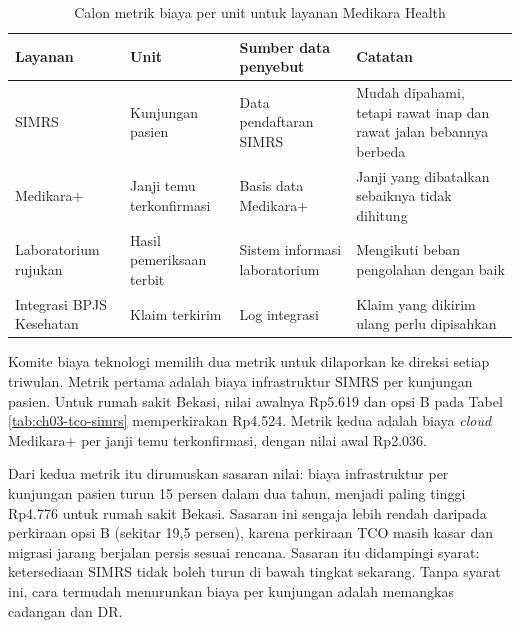 \begin{table}[!htb]
  \centering
  \caption{Calon metrik biaya per unit untuk layanan Medikara Health}
  \label{tab:ch03-unit-metrik}
  \footnotesize
  \begin{tabularx}{\textwidth}{>{\raggedright\arraybackslash}p{2.3cm} >{\raggedright\arraybackslash}p{2.6cm} >{\raggedright\arraybackslash}X >{\raggedright\arraybackslash}X}
    \hline
    \textbf{Layanan} & \textbf{Unit} & \textbf{Sumber data penyebut} & \textbf{Catatan} \\ \hline
    SIMRS & Kunjungan pasien & Data pendaftaran SIMRS & Mudah dipahami, tetapi rawat inap dan rawat
      jalan bebannya berbeda \\ \hline
    Medikara+ & Janji temu terkonfirmasi & Basis data Medikara+ & Janji yang dibatalkan sebaiknya
      tidak dihitung \\ \hline
    Laboratorium rujukan & Hasil pemeriksaan terbit & Sistem informasi laboratorium & Mengikuti
      beban pengolahan dengan baik \\ \hline
    Integrasi BPJS Kesehatan & Klaim terkirim & Log integrasi & Klaim yang dikirim ulang perlu
      dipisahkan \\ \hline
  \end{tabularx}
\end{table}

\begin{kasus}[title={Kasus Medikara Health: Biaya per Kunjungan dan per Janji Temu}]
  Komite biaya teknologi memilih dua metrik untuk dilaporkan ke direksi setiap triwulan. Metrik
  pertama adalah biaya infrastruktur SIMRS per kunjungan pasien. Untuk rumah sakit Bekasi, nilai
  awalnya Rp5.619 dan opsi B pada Tabel \ref{tab:ch03-tco-simrs} memperkirakan Rp4.524. Metrik kedua
  adalah biaya \textit{cloud} Medikara+ per janji temu terkonfirmasi, dengan nilai awal Rp2.036.

  Dari kedua metrik itu dirumuskan sasaran nilai: biaya infrastruktur per kunjungan pasien turun 15
  persen dalam dua tahun, menjadi paling tinggi Rp4.776 untuk rumah sakit Bekasi. Sasaran ini
  sengaja lebih rendah daripada perkiraan opsi B (sekitar 19,5 persen), karena perkiraan TCO masih
  kasar dan migrasi jarang berjalan persis sesuai rencana. Sasaran itu didampingi syarat:
  ketersediaan SIMRS tidak boleh turun di bawah tingkat sekarang. Tanpa syarat ini, cara termudah
  menurunkan biaya per kunjungan adalah memangkas cadangan dan DR.
\end{kasus}

